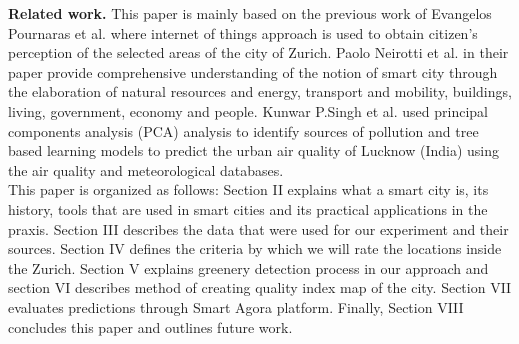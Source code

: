 \documentclass[letterpaper]{article}
\newcommand{\mypar}[1]{{\bf #1.}}
\begin{document}
\mypar{Related work} This paper is mainly based on the previous work of Evangelos Pournaras et al. \cite{smartCities}
where internet of things approach is used to obtain citizen's perception of the selected areas of the city of Zurich.
Paolo Neirotti et al. \cite{smartCities2} in their paper provide comprehensive understanding of the notion of smart city
through the elaboration of natural resources and energy, transport and mobility, buildings, living, government, economy
and people. Kunwar P.Singh et al. \cite{pollution} used principal components analysis (PCA) analysis to identify sources
of pollution and tree based learning models to predict the urban air quality of Lucknow (India) using the air quality
and meteorological databases.
\\
\indent This paper is organized as follows: Section II explains what a smart city is, its history, tools that are used
in smart cities and its practical applications in the praxis. Section III describes the data that were used for our
experiment and their sources. Section IV defines the criteria by which we will rate the locations inside the Zurich.
Section V explains greenery detection process in our approach and section VI describes method of creating quality index
map of the city. Section VII evaluates predictions through Smart Agora platform. Finally, Section VIII concludes this
paper and outlines future work.
\end{document}
